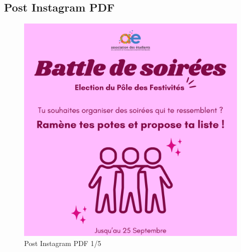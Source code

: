 \subsection*{Post Instagram \gls{PDF}}\label{subsec:post-insta-pdf}

\begin{figure}[!h]
    \begin{center}
        \includegraphics[scale=0.2]{ressources/post pdf/PDF}
        \caption{Post Instagram \gls{PDF} 1/5 \label{fig:pdf1}}
    \end{center}
\end{figure}


